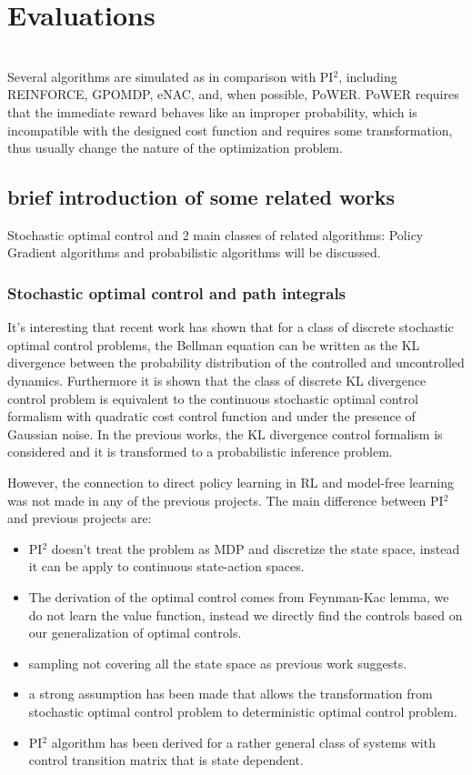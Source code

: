 \documentclass[journal]{IEEEtran}
\begin{document}
 


 \section{Evaluations}
\ \\
 Several algorithms are simulated as in comparison with PI$^{2}$, including REINFORCE, GPOMDP, eNAC, and, when possible, PoWER. PoWER requires 
 that the immediate reward behaves like an improper probability, which is incompatible with the designed cost function and requires some transformation, thus usually change
 the nature of the optimization problem. 

 \subsection{brief introduction of some related works}

 Stochastic optimal control and 2 main classes of related algorithms: Policy Gradient algorithms and probabilistic algorithms will be discussed.

 \subsubsection{Stochastic optimal control and path integrals}

 It's interesting that recent work has shown that for a class of discrete stochastic optimal control problems, the Bellman equation can be written as the KL divergence 
 between the probability distribution of the controlled and uncontrolled dynamics. Furthermore it is shown that the class of discrete KL divergence control problem is
  equivalent to the continuous stochastic optimal control formalism with quadratic cost control function and under the presence of Gaussian noise. In the previous works, 
  the KL divergence control formalism is considered and it is transformed to a probabilistic inference problem.

  However, the connection to direct policy learning in RL and model-free learning was not made in any of the previous projects.
The main difference between PI$^2$ and previous projects are:

\begin{itemize}
  \item PI$^2$ doesn't treat the problem as MDP and discretize the state space, instead it can be apply to continuous state-action spaces.
  \item The derivation of the optimal control comes from Feynman-Kac lemma, we do not learn the value function, instead we directly find the controls based on our generalization of optimal controls.
  \item sampling not covering all the state space as previous work suggests.
  \item a strong assumption has been made that allows the transformation from stochastic optimal control problem to deterministic optimal control problem.
  \item PI$^2$ algorithm has been derived for a rather general class of systems with control transition matrix that is state dependent.
\end{itemize}
\end{document}
